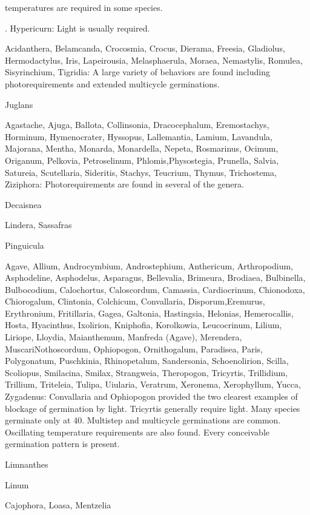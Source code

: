 \begin{description}
temperatures are required in some species.
\item[Hypericaceae (Clusiaceae)]. Hypericurn: Light is usually required.
\item[Iridaceae] Acidanthera, Belamcanda, Crocosmia, Crocus, Dierama,
Freesia, Gladiolus, Hermodactylus, Iris, Lapeirousia, Melasphaerula, Moraea,
Nemastylis, Romulea, Sisyrinchium, Tigridia: A large variety of behaviors are found
including photorequirements and extended multicycle germinations.
\item[Juglandaceae] Juglans
\item[Lamiaceae] Aga\-stache, Ajuga, Ballota, Col\-lin\-sonia, Draco\-cephalum,
Eremo\-stachys, Horminum, Hymenocrater, Hyssopus, Lallemantia, Lamium,
Lavandula, Majorana, Mentha, Monarda, Monardella, Nepeta, Rosmarinus, Ocimum,
Origanum, Pelkovia, Petroselinum, Phlomis,Physostegia, Prunella, Salvia, Satureia,
Scutellaria, Sideritis, Stachys, Teucrium, Thymus, Trichostema, Ziziphora:
Photorequirements are found in several of the genera.
\item[Lardizabalaceae] Decaisnea
\item[Lauraceae] Lindera, Sassafras
\item[Lentibulariaceae] Pinguicula
\item[Liliaceae] Agave, Allium, Androcymbium, Androstephium, Anthericum,
Arthropodium, Asphodeline, Asphodelus, Asparagus, Bellevalia, Brimeura, Brodiaea,
Bulbinella, Bulbocodium, Calochortus, Caloscordum, Camassia, Cardiocrinum,
Chionodoxa, Chiorogalum, Clintonia, Colchicum, Convallaria, Disporum,Eremurus,
Erythronium, Fritillaria, Gagea, Galtonia, Hastingsia, Helonias, Hemerocallis, Hosta,
Hyacinthus, Ixolirion, Kniphofia, Korolkowia, Leucocrinum, Lilium, Liriope, Lloydia,
Maianthemum, Manfreda (Agave), Merendera, MuscariNothoscordum, Ophiopogon,
Ornithogalum, Paradisea, Paris, Polygonatum, Puschkinia, Rhinopetalum,
Sandersonia, Schoenolirion, Scilla, Scoliopus, Smilacina, Smilax, Strangweia,
Theropogon, Tricyrtis, Trillidium, Trillium, Triteleia, Tulipa, Uiularia, Veratrum,
Xeronema, Xerophyllum, Yucca, Zygadenus: Convallaria and Ophiopogon provided
the two clearest examples of blockage of germination by light. Tricyrtis generally
require light. Many species germinate only at 40. Multistep and multicycle
germinations are common. Oscillating temperature requirements are also found.
Every conceivable germination pattern is present.
\item[Limnanthaceae] Limnanthes
\item[Linaceae] Linum
\item[Loasaceae] Cajophora, Loasa, Mentzelia

\end{description}
